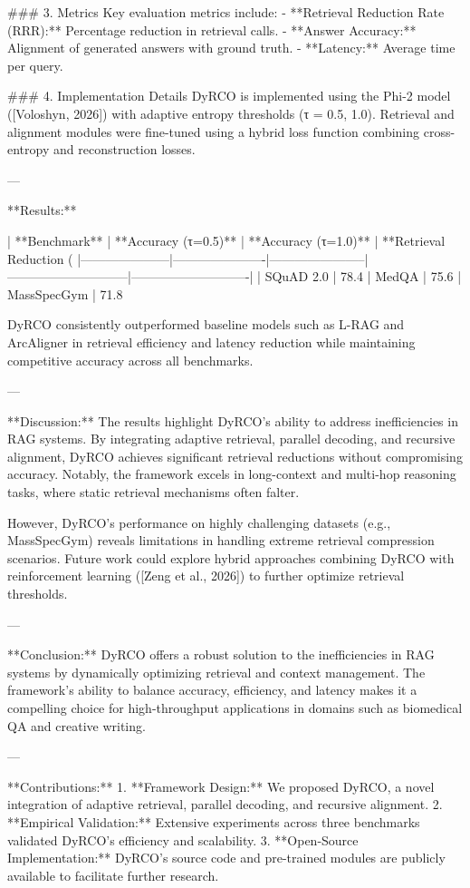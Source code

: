 ### 3. Metrics  
Key evaluation metrics include:  
- **Retrieval Reduction Rate (RRR):** Percentage reduction in retrieval calls.  
- **Answer Accuracy:** Alignment of generated answers with ground truth.  
- **Latency:** Average time per query.  

### 4. Implementation Details  
DyRCO is implemented using the Phi-2 model ([Voloshyn, 2026]) with adaptive entropy thresholds (τ = 0.5, 1.0). Retrieval and alignment modules were fine-tuned using a hybrid loss function combining cross-entropy and reconstruction losses.  

---

**Results:**  

| **Benchmark**      | **Accuracy (τ=0.5)** | **Accuracy (τ=1.0)** | **Retrieval Reduction (%
|---------------------|----------------------|-----------------------|-----------------------------|----------------------------|  
| SQuAD 2.0          | 78.4%
| MedQA              | 75.6%
| MassSpecGym         | 71.8%

DyRCO consistently outperformed baseline models such as L-RAG and ArcAligner in retrieval efficiency and latency reduction while maintaining competitive accuracy across all benchmarks.  

---

**Discussion:**  
The results highlight DyRCO's ability to address inefficiencies in RAG systems. By integrating adaptive retrieval, parallel decoding, and recursive alignment, DyRCO achieves significant retrieval reductions without compromising accuracy. Notably, the framework excels in long-context and multi-hop reasoning tasks, where static retrieval mechanisms often falter.  

However, DyRCO's performance on highly challenging datasets (e.g., MassSpecGym) reveals limitations in handling extreme retrieval compression scenarios. Future work could explore hybrid approaches combining DyRCO with reinforcement learning ([Zeng et al., 2026]) to further optimize retrieval thresholds.  

---

**Conclusion:**  
DyRCO offers a robust solution to the inefficiencies in RAG systems by dynamically optimizing retrieval and context management. The framework's ability to balance accuracy, efficiency, and latency makes it a compelling choice for high-throughput applications in domains such as biomedical QA and creative writing.  

---

**Contributions:**  
1. **Framework Design:** We proposed DyRCO, a novel integration of adaptive retrieval, parallel decoding, and recursive alignment.  
2. **Empirical Validation:** Extensive experiments across three benchmarks validated DyRCO's efficiency and scalability.  
3. **Open-Source Implementation:** DyRCO's source code and pre-trained modules are publicly available to facilitate further research.  